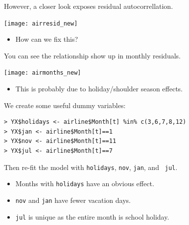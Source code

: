 \documentclass[12pt,xcolor=svgnames]{beamer}
\newcommand{\rd}{\color{red}}
\newcommand{\bl}{\color{blue}}
\newcommand{\sk}{\vspace{.4cm}}
\newcommand{\nochap}{\vspace{0.5cm}}
\newcommand{\nsk}{\vspace{-.4cm}}
\begin{document}
\begin{frame}
\nochap

\vspace{-0.15cm}
However, a closer look exposes residual autocorrellation.

\begin{center}
\texttt{[image: airresid\_new]}
\end{center}

\nsk
\hfill \begin{minipage}{5cm}
\begin{itemize}
\item {\rd How can we fix this?}
\end{itemize}
\end{minipage}

\end{frame}


\begin{frame}
\nochap

\vspace{-0.25cm}
You can see the relationship show up in monthly residuals.
\begin{center}
\texttt{[image: airmonths\_new]}
\end{center}
\nsk
\begin{itemize}
\item This is probably due to holiday/shoulder season effects.
\end{itemize}
\end{frame}

\begin{frame}[fragile]
\nochap

We create some useful dummy variables:
{\bl \small
\begin{verbatim}
> YX$holidays <- airline$Month[t] %in% c(3,6,7,8,12) 
> YX$jan <- airline$Month[t]==1
> YX$nov <- airline$Month[t]==11
> YX$jul <- airline$Month[t]==7
\end{verbatim}
}

\sk
Then re-fit the model with {\tt holidays}, {\tt nov}, {\tt jan}, and {\tt
  jul}.
\begin{itemize}
\item Months with {\tt\rd holidays} have an obvious effect.
\item {\tt\rd nov} and {\tt\rd jan} have fewer vacation days.
\item {\tt\rd jul} is unique as the entire month is school holiday.
\end{itemize}

\end{frame}
\end{document}
